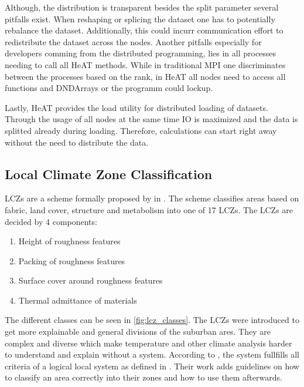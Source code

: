 Although, the distribution is transparent besides the split parameter several pitfalls exist.
When reshaping or splicing the dataset one has to potentially rebalance the dataset. Additionally, this could incurr communication effort
to redistribute the dataset across the nodes.
Another pitfalls especially for developers comming from the distributed programming, lies in all processes needing to call all \gls{HeAT} methods.
While in traditional \gls{MPI} one discriminates between the processes based on the rank, in \gls{HeAT} all nodes need to access all functions and DNDArrays or the
programm could lockup.

Lastly, \gls{HeAT} provides the load utility for distributed loading of datasets. Through the usage of all nodes at the same time \gls{IO} is maximized and the data
is splitted already during loading. Therefore, calculations can start right away without the need to distribute the data.
\cite{krajsek_helmholtz_nodate}


\subsection{Local Climate Zone Classification}
\label{subsec:local_climate_zone_classification}

\glspl{LCZ} are a scheme formally proposed by \citeauthor{stewart_local_2012} in \cite{stewart_local_2012}. The scheme classifies areas based on fabric, land cover, structure
and metabolism into one of 17 \gls{LCZ}s. \cite{xue_applications_2020}
The \gls{LCZ}s are decided by 4 components:
\begin{enumerate}
  \item Height of roughness features
  \item Packing of roughness features
  \item Surface cover around roughness features
  \item Thermal admittance of materials
\end{enumerate}
The different classes can be seen in \cref{fig:lcz_classes}.
The \glspl{LCZ} were introduced to get more explainable and general divisions of the suburban ares. They are complex and diverse which make temperature and other climate analysis harder
to understand and explain without a system. According to \citeauthor{stewart_local_2012}, the system fullfills all criteria of a logical local system as defined in \cite{grigg_logic_1965}.
Their work adds guidelines on how to classify an area correctly into their zones and how to use them afterwards.


